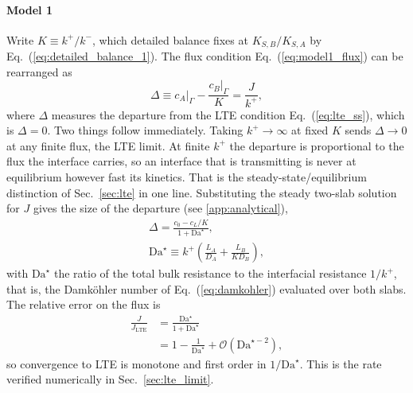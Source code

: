 \documentclass[5p]{elsarticle}
\newcommand{\Da}{\mathrm{Da}}
\begin{document}
\paragraph{Model 1} Write $K \equiv k^{+}/k^{-}$, which detailed balance fixes at $K_{S,B}/K_{S,A}$ by Eq.~(\ref{eq:detailed_balance_1}).
The flux condition Eq.~(\ref{eq:model1_flux}) can be rearranged as
\begin{equation}
    \Delta \equiv c_A\big|_\Gamma - \frac{c_B\big|_\Gamma}{K}
    = \frac{J}{k^{+}} ,
    \label{eq:defect_1}
\end{equation}
where $\Delta$ measures the departure from the LTE condition Eq.~(\ref{eq:lte_ss}), which is $\Delta = 0$.
Two things follow immediately.
Taking $k^{+} \rightarrow \infty$ at fixed $K$ sends $\Delta \rightarrow 0$ at any finite flux, the LTE limit.
At finite $k^{+}$ the departure is proportional to the flux the interface carries, so an interface that is transmitting is never at equilibrium however fast its kinetics.
That is the steady-state/equilibrium distinction of Sec.~\ref{sec:lte} in one line.
Substituting the steady two-slab solution for $J$ gives the size of the departure (see \ref{app:analytical}),
\begin{equation}
    \begin{gathered}
        \Delta = \frac{c_0 - c_L/K}{1 + \Da^{\star}} , \\[3pt]
        \Da^{\star} \equiv k^{+}\left(\frac{L_A}{D_A}
                                    + \frac{L_B}{K D_B}\right) ,
    \end{gathered}
    \label{eq:defect_1_explicit}
\end{equation}
with $\Da^{\star}$ the ratio of the total bulk resistance to the interfacial resistance $1/k^{+}$, that is, the Damk\"ohler number of Eq.~(\ref{eq:damkohler}) evaluated over both slabs.
The relative error on the flux is
\begin{equation}
    \begin{aligned}
        \frac{J}{J_\mathrm{LTE}}
        &= \frac{\Da^{\star}}{1 + \Da^{\star}} \\[3pt]
        &= 1 - \frac{1}{\Da^{\star}}
           + \mathcal{O}\!\left(\Da^{\star -2}\right) ,
    \end{aligned}
    \label{eq:model1_convergence}
\end{equation}
so convergence to LTE is monotone and first order in $1/\Da^{\star}$.
This is the rate verified numerically in Sec.~\ref{sec:lte_limit}.
\end{document}

